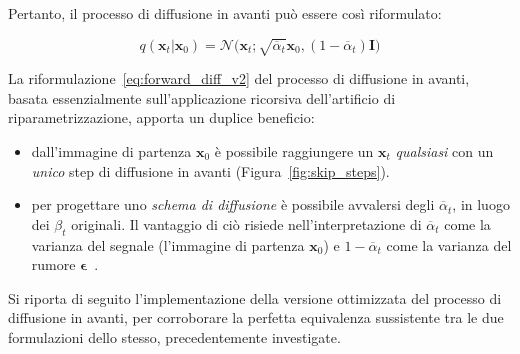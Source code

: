 \noindent Pertanto, il processo di diffusione in avanti può essere così riformulato:
\begin{Mybox}
\begin{equation}
  q(\mathbf{x}_t|\mathbf{x}_0)=\mathcal{N}\bigl(\mathbf{x}_t;\sqrt{\overline{\alpha}_t}\mathbf{x}_0,(1-\overline{\alpha}_t)\bm{I}\bigr) \label{eq:forward_diff_v2}
\end{equation}
\end{Mybox}
\smallskip
\noindent La riformulazione~\eqref{eq:forward_diff_v2} del processo di diffusione in avanti, basata 
essenzialmente sull'applicazione ricorsiva dell'artificio di riparametrizzazione, apporta un duplice beneficio:
\begin{itemize}
\item dall'immagine di partenza $\mathbf{x}_0$ è possibile raggiungere un $\mathbf{x}_t$ \emph{qualsiasi} con un \emph{unico} step di diffusione in avanti (Figura~\ref{fig:skip_steps}).
\item per progettare uno \emph{schema di diffusione} è possibile avvalersi degli $\overline{\alpha}_t$, in luogo dei $\beta_t$ originali. Il vantaggio di ciò 
risiede nell'interpretazione di $\overline{\alpha}_t$ come la varianza del segnale (l'immagine di partenza $\mathbf{x}_0$) e 
$1-\overline{\alpha}_t$ come la varianza del rumore $\bm{\epsilon}$~\cite{fosterGenerativeDeepLearning2023}.
\end{itemize} 

\noindent Si riporta di seguito l'implementazione della versione ottimizzata del processo di diffusione in avanti, 
per corroborare la perfetta equivalenza sussistente tra le due formulazioni dello stesso, precedentemente investigate.


